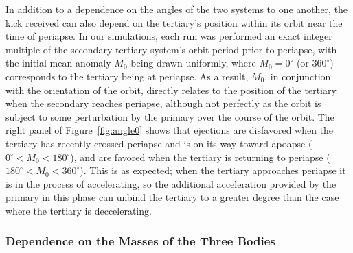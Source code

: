 \documentclass[a4paper,twocolumn]{emulateapj}
\begin{document}
{In addition to a dependence on the angles of the two systems to one another, the kick received can also depend on the tertiary's position within its orbit near the time of periapse. In our simulations, each run was performed an exact integer multiple of the secondary-tertiary system's orbit period prior to periapse, with the initial mean anomaly $M_{0}$ being drawn uniformly, where $M_{0} = 0^{\circ}$ (or $360^{\circ}$) corresponds to the tertiary being at periapse. As a result, $M_{0}$, in conjunction with the orientation of the orbit, directly relates to the position of the tertiary when the secondary reaches periapse, although not perfectly as the orbit is subject to some perturbation by the primary over the course of the orbit. The right panel of Figure~\ref{fig:angle0} shows that ejections are disfavored when the tertiary has recently crossed periapse and is on its way toward apoapse ($0^{\circ} < M_{0} < 180^{\circ}$), and are favored when the tertiary is returning to periapse ($180^{\circ} < M_{0} < 360^{\circ}$). This is as expected; when the tertiary approaches periapse it is in the process of accelerating, so the additional acceleration provided by the primary in this phase can unbind the tertiary to a greater degree than the case where the tertiary is deccelerating. 

\subsubsection{Dependence on the Masses of the Three Bodies}

}
\end{document}
